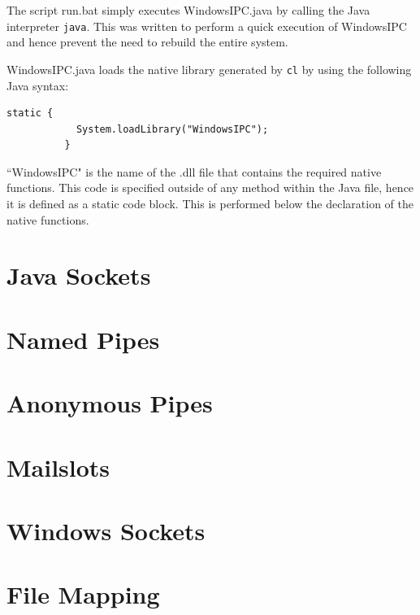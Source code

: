 \documentclass[12pt] {newrucsthesis}    %
\def\code#1{\texttt{#1}}
\begin{document}
        The script run.bat simply executes WindowsIPC.java by calling the Java interpreter \code{java}.
        This was written to perform a quick execution of WindowsIPC and hence prevent the need to rebuild
        the entire system.

        WindowsIPC.java loads the native library generated by \code{cl} by using the following Java syntax:
        \begin {lstlisting}[caption=Loading The Native Library]
          static {
            System.loadLibrary("WindowsIPC");
          }
        \end{lstlisting}
        ``WindowsIPC" is the name of the .dll file that contains the required native functions. This code
        is specified outside of any method within the Java file, hence it is defined as a static code block.
        This is performed below the declaration of the native functions.



    \section{Java Sockets} \label{jsockssections}

    \section{Named Pipes} \label{npsection}

    \section{Anonymous Pipes} \label{anonpipesection}

    \section{Mailslots} \label{mssection}

    \section{Windows Sockets} \label{winsocksection}

    \section{File Mapping} \label{filemapsection}
\end{document}
